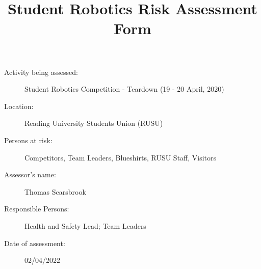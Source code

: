 \documentclass[12pt,a4paper]{scrartcl}
\title{Student Robotics Risk Assessment Form}
\begin{document}
\maketitle

\begin{description}
\item[Activity being assessed:] Student Robotics Competition - Teardown (19 - 20 April, 2020)
\item[Location:] Reading University Students Union (RUSU)
\item[Persons at risk:] Competitors, Team Leaders, Blueshirts, RUSU Staff, Visitors
\end{description}

\begin{description}
\item[Assessor's name:] Thomas Scarsbrook
\item[Responsible Persons:] Health and Safety Lead; Team Leaders
\item[Date of assessment:] 02/04/2022
\end{description}
\clearpage

\newcommand{\risk}[4]{
 #1 & #2 & #3 & #4 \\
}
\end{document}
